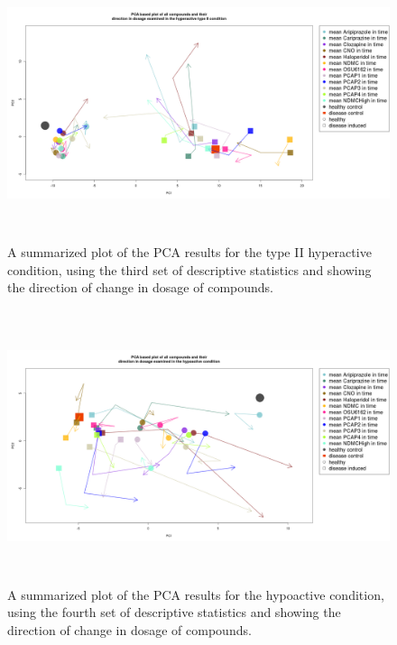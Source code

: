 \documentclass[a4paper,12pt]{article}
\begin{document}
\begin{figure}[h!]
\begin{center}
\includegraphics[width=16cm,height=8cm]{All_together_doses_DarkPTZset3_NM.png}
\caption{A summarized plot of the PCA results for the type II hyperactive condition, using the third set of descriptive statistics and showing the direction of change in dosage of compounds.}
\end{center}
\end{figure}
\newpage



\begin{figure}[h!]
\begin{center}
\includegraphics[width=16cm,height=8cm]{All_together_doses_DarkApoLowset4.png}
\caption{A summarized plot of the PCA results for the hypoactive condition, using the fourth set of descriptive statistics and showing the direction of change in dosage of compounds.}
\end{center}
\end{figure}
\newpage
\end{document}
